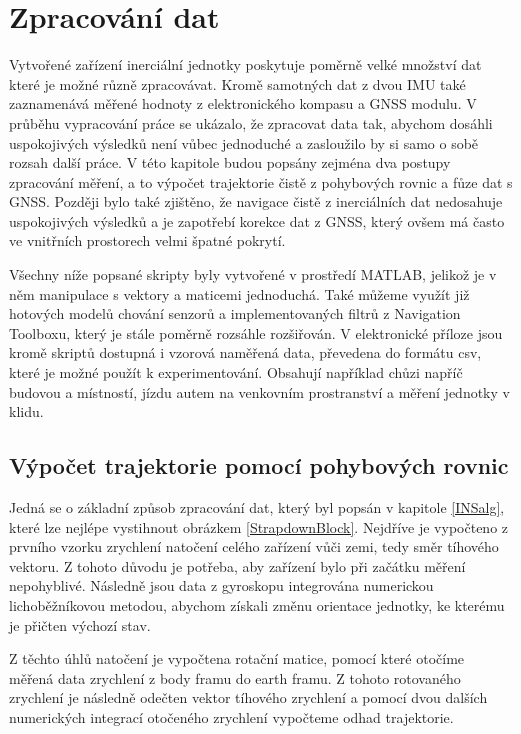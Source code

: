 \chapter{Zpracování dat}
Vytvořené zařízení inerciální jednotky poskytuje poměrně velké množství dat které je možné různě zpracovávat. Kromě samotných dat z dvou IMU také zaznamenává měřené hodnoty z elektronického kompasu a GNSS modulu. V průběhu vypracování práce se ukázalo, že zpracovat data tak, abychom dosáhli uspokojivých výsledků není vůbec jednoduché a zasloužilo by si samo o sobě rozsah další práce. V této kapitole budou popsány zejména dva postupy zpracování měření, a to výpočet trajektorie čistě z pohybových rovnic a fůze dat s GNSS. Později bylo také zjištěno, že navigace čistě z inerciálních dat nedosahuje uspokojivých výsledků a je zapotřebí korekce dat z GNSS, který ovšem má často ve vnitřních prostorech velmi špatné pokrytí.

Všechny níže popsané skripty byly vytvořené v prostředí MATLAB, jelikož je v něm manipulace s vektory a maticemi jednoduchá. Také můžeme využít již hotových modelů chování senzorů a implementovaných filtrů z Navigation Toolboxu, který je stále poměrně rozsáhle rozšiřován. V elektronické příloze jsou kromě skriptů dostupná i vzorová naměřená data, převedena do formátu csv, které je možné použít k experimentování. Obsahují například chůzi napříč budovou a místností, jízdu autem na venkovním prostranství a měření jednotky v klidu.

\section{Výpočet trajektorie pomocí pohybových rovnic}
Jedná se o základní způsob zpracování dat, který byl popsán v kapitole \ref{INSalg}, které lze nejlépe vystihnout obrázkem  \ref{StrapdownBlock}. Nejdříve je vypočteno z prvního vzorku zrychlení natočení celého zařízení vůči zemi, tedy směr tíhového vektoru. Z tohoto důvodu je potřeba, aby zařízení bylo při začátku měření nepohyblivé. Následně jsou data z gyroskopu integrována numerickou lichoběžníkovou metodou, abychom získali změnu orientace jednotky, ke kterému je přičten výchozí stav.

Z těchto úhlů natočení je vypočtena rotační matice, pomocí které otočíme měřená data zrychlení z body framu do earth framu. Z tohoto rotovaného zrychlení je následně odečten vektor tíhového zrychlení a pomocí dvou dalších numerických integrací otočeného zrychlení vypočteme odhad trajektorie.

